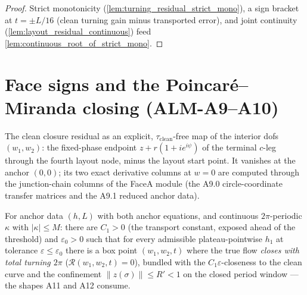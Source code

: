 \begin{proof}
  \leanok
  Strict monotonicity (\cref{lem:turning_residual_strict_mono}), a sign
  bracket at $t=\pm L/16$ (clean turning gain minus transported error), and
  joint continuity (\cref{lem:layout_residual_continuous}) feed
  \cref{lem:continuous_root_of_strict_mono}.
\end{proof}

\section{Face signs and the Poincaré--Miranda closing (ALM-A9--A10)}

\begin{definition}
  \label{def:a9_residual}
  The clean closure residual as an explicit, $\tau_{\mathrm{clean}}$-free map
  of the interior dofs $(w_1,w_2)$: the fixed-phase endpoint
  $z+r(1+ie^{i\psi})$ of the terminal $c$-leg through the fourth layout node,
  minus the layout start point.  It vanishes at the anchor $(0,0)$; its two
  exact derivative columns at $w=0$ are computed through the junction-chain
  columns of the FaceA module (the A9.0 circle-coordinate transfer matrices
  and the A9.1 reduced anchor data).
\end{definition}

\begin{theorem}
  \label{thm:layout_closing}
  For anchor data $(h,L)$ with both anchor equations, and continuous
  $2\pi$-periodic $\kappa$ with $|\kappa|\le M$: there are $C_1>0$ (the
  transport constant, exposed ahead of the threshold) and $\varepsilon_0>0$
  such that for every admissible plateau-pointwise $h_1$ at tolerance
  $\varepsilon\le\varepsilon_0$ there is a box point $(w_1,w_2,t)$ where the
  true flow \emph{closes with total turning $2\pi$}
  ($\mathcal R(w_1,w_2,t)=0$), bundled with the $C_1\varepsilon$-closeness to
  the clean curve and the confinement $\|z(\sigma)\|\le R'<1$ on the closed
  period window — the shapes A11 and A12 consume.
\end{theorem}

